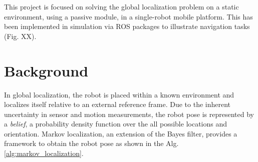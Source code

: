 \documentclass[10pt,journal,compsoc]{IEEEtran}
\begin{document}
This project is focused on solving the global localization problem on a static environment, using a passive module, in a single-robot mobile platform. This has been implemented in simulation via ROS \cite{288} packages to illustrate navigation tasks (Fig. XX).  




%
%
%


\section{Background}

In global localization, the robot is placed within a known environment and localizes itself relative to an external reference frame. Due to the inherent uncertainty in sensor and motion measurements, the robot pose is represented by a \textit{belief}, a probability density function over the all possible locations and orientation.  Markov localization, an extension of the Bayes filter, provides a framework to obtain the robot pose as shown in the  Alg. \ref{alg:markov_localization}. 
\end{document}
